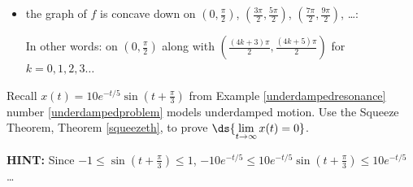 \documentclass{ximera}
\begin{document}
\begin{problem}
\begin{enumerate}
\begin{solution}
\begin{itemize}
In other words: on  $\left( \frac{(4k+1) \pi}{2}, \frac{(4k+3)\pi}{2}\right)$ for $k = 0,1, 2, 3, \ldots$

\item the graph of $f$ is concave down on  $\left(0, \frac{\pi}{2} \right)$, $\left(\frac{3\pi}{2}, \frac{5 \pi}{2} \right)$, $\left(\frac{7 \pi}{2}, \frac{9\pi}{2} \right)$, \ldots : 

In other words:  on $\left(0, \frac{\pi}{2} \right)$ along with $\left( \frac{(4k+3) \pi}{2}, \frac{(4k+5)\pi}{2}\right)$ for $k  = 0, 1, 2, 3 \ldots$

\end{itemize}
\end{solution}

\end{enumerate}

\end{problem}


\begin{problem} \label{squeezefordampedmotionexercise}
Recall  $x(t) = 10e^{-t/5} \sin\left(t + \frac{\pi}{3}\right)$ from  Example \ref{underdampedresonance} number \ref{underdampedproblem} models underdamped motion. Use the Squeeze Theorem, Theorem \ref{squeezeth}, to prove $\ds{\lim_{t \rightarrow \infty} x(t) = 0}$.

\textbf{HINT:}  Since $-1 \leq \sin\left(t + \frac{\pi}{3}\right) \leq 1$, $-10e^{-t/5} \leq   10e^{-t/5} \sin\left(t + \frac{\pi}{3}\right) \leq 10e^{-t/5}$ \ldots

\end{problem}
\end{document}
